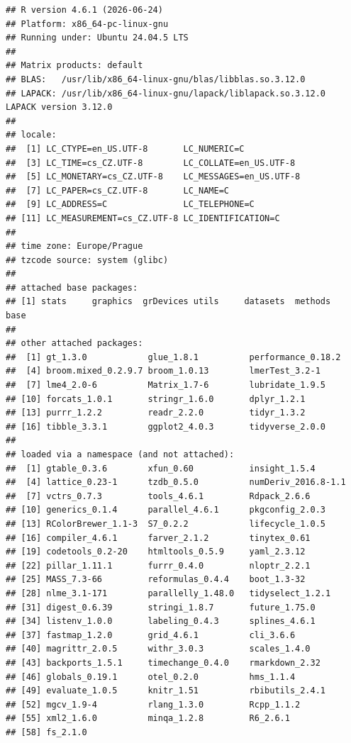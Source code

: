 \documentclass[
  10pt,
]{article}
\begin{document}
\begin{verbatim}
## R version 4.6.1 (2026-06-24)
## Platform: x86_64-pc-linux-gnu
## Running under: Ubuntu 24.04.5 LTS
##
## Matrix products: default
## BLAS:   /usr/lib/x86_64-linux-gnu/blas/libblas.so.3.12.0
## LAPACK: /usr/lib/x86_64-linux-gnu/lapack/liblapack.so.3.12.0  LAPACK version 3.12.0
##
## locale:
##  [1] LC_CTYPE=en_US.UTF-8       LC_NUMERIC=C
##  [3] LC_TIME=cs_CZ.UTF-8        LC_COLLATE=en_US.UTF-8
##  [5] LC_MONETARY=cs_CZ.UTF-8    LC_MESSAGES=en_US.UTF-8
##  [7] LC_PAPER=cs_CZ.UTF-8       LC_NAME=C
##  [9] LC_ADDRESS=C               LC_TELEPHONE=C
## [11] LC_MEASUREMENT=cs_CZ.UTF-8 LC_IDENTIFICATION=C
##
## time zone: Europe/Prague
## tzcode source: system (glibc)
##
## attached base packages:
## [1] stats     graphics  grDevices utils     datasets  methods   base
##
## other attached packages:
##  [1] gt_1.3.0            glue_1.8.1          performance_0.18.2
##  [4] broom.mixed_0.2.9.7 broom_1.0.13        lmerTest_3.2-1
##  [7] lme4_2.0-6          Matrix_1.7-6        lubridate_1.9.5
## [10] forcats_1.0.1       stringr_1.6.0       dplyr_1.2.1
## [13] purrr_1.2.2         readr_2.2.0         tidyr_1.3.2
## [16] tibble_3.3.1        ggplot2_4.0.3       tidyverse_2.0.0
##
## loaded via a namespace (and not attached):
##  [1] gtable_0.3.6        xfun_0.60           insight_1.5.4
##  [4] lattice_0.23-1      tzdb_0.5.0          numDeriv_2016.8-1.1
##  [7] vctrs_0.7.3         tools_4.6.1         Rdpack_2.6.6
## [10] generics_0.1.4      parallel_4.6.1      pkgconfig_2.0.3
## [13] RColorBrewer_1.1-3  S7_0.2.2            lifecycle_1.0.5
## [16] compiler_4.6.1      farver_2.1.2        tinytex_0.61
## [19] codetools_0.2-20    htmltools_0.5.9     yaml_2.3.12
## [22] pillar_1.11.1       furrr_0.4.0         nloptr_2.2.1
## [25] MASS_7.3-66         reformulas_0.4.4    boot_1.3-32
## [28] nlme_3.1-171        parallelly_1.48.0   tidyselect_1.2.1
## [31] digest_0.6.39       stringi_1.8.7       future_1.75.0
## [34] listenv_1.0.0       labeling_0.4.3      splines_4.6.1
## [37] fastmap_1.2.0       grid_4.6.1          cli_3.6.6
## [40] magrittr_2.0.5      withr_3.0.3         scales_1.4.0
## [43] backports_1.5.1     timechange_0.4.0    rmarkdown_2.32
## [46] globals_0.19.1      otel_0.2.0          hms_1.1.4
## [49] evaluate_1.0.5      knitr_1.51          rbibutils_2.4.1
## [52] mgcv_1.9-4          rlang_1.3.0         Rcpp_1.1.2
## [55] xml2_1.6.0          minqa_1.2.8         R6_2.6.1
## [58] fs_2.1.0
\end{verbatim}
\end{document}
